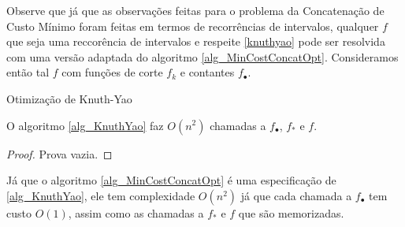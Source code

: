 Observe que já que as observações feitas para o problema da Concatenação de Custo Mínimo foram feitas em termos de recorrências de intervalos, qualquer $f$ que seja uma reccorência de intervalos e respeite \ref{knuthyao} pode ser resolvida com uma versão adaptada do algoritmo \ref{alg_MinCostConcatOpt}. Consideramos então tal $f$ com funções de corte $f_k$ e contantes $f_\bullet$.

\begin{algorithm}[h]
\caption{Otimização de Knuth-Yao}
\label{alg_KnuthYao}
\begin{algorithmic}[1]
\State \Return {}
\EndFunction
\end{algorithmic}
\end{algorithm}

\begin{prop}
O algoritmo \ref{alg_KnuthYao} faz $O(n^2)$ chamadas a $f_\bullet$, $f_*$ e $f$.
\end{prop}

\begin{proof}
Prova vazia.
\end{proof}

Já que o algoritmo \ref{alg_MinCostConcatOpt} é uma especificação de \ref{alg_KnuthYao}, ele tem complexidade $O(n^2)$ já que cada chamada a $f_\bullet$ tem custo $O(1)$, assim como as chamadas a $f_*$ e $f$ que são memorizadas.
